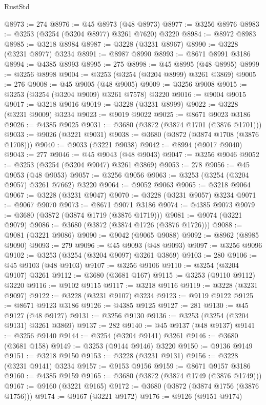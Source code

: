 \begin{lexlean}{RustStd}
\begin{coremodule}
@8973 := 274
@8976 := @45 @8973 (@48 @8973)
@8977 := @3256 @8976
@8983 := @3253 (@3254 (@3204 @8977) @3261 @7620) @3220
@8984 := @8972 @8983
@8985 := @3218 @8984
@8987 := @3228 (@3231 @8967)
@8990 := @3228 (@3231 @8977) @3234
@8991 := @8987 @8990
@8993 := @8671 @8991 @3186
@8994 := @4385 @8993
@8995 := 275
@8998 := @45 @8995 (@48 @8995)
@8999 := @3256 @8998
@9004 := @3253 (@3254 (@3204 @8999) @3261 @3869)
@9005 := 276
@9008 := @45 @9005 (@48 @9005)
@9009 := @3256 @9008
@9015 := @3253 (@3254 (@3204 @9009) @3261 @7578) @3220
@9016 := @9004 @9015
@9017 := @3218 @9016
@9019 := @3228 (@3231 @8999)
@9022 := @3228 (@3231 @9009) @3234
@9023 := @9019 @9022
@9025 := @8671 @9023 @3186
@9026 := @4385 @9025
@9031 := @3680 (@3872 (@3874 @1701 (@3876 @1701)))
@9033 := @9026 (@3221 @9031)
@9038 := @3680 (@3872 (@3874 @1708 (@3876 @1708)))
@9040 := @9033 (@3221 @9038)
@9042 := @8994 (@9017 @9040)
@9043 := 277
@9046 := @45 @9043 (@48 @9043)
@9047 := @3256 @9046
@9052 := @3253 (@3254 (@3204 @9047) @3261 @3869)
@9053 := 278
@9056 := @45 @9053 (@48 @9053)
@9057 := @3256 @9056
@9063 := @3253 (@3254 (@3204 @9057) @3261 @7662) @3220
@9064 := @9052 @9063
@9065 := @3218 @9064
@9067 := @3228 (@3231 @9047)
@9070 := @3228 (@3231 @9057) @3234
@9071 := @9067 @9070
@9073 := @8671 @9071 @3186
@9074 := @4385 @9073
@9079 := @3680 (@3872 (@3874 @1719 (@3876 @1719)))
@9081 := @9074 (@3221 @9079)
@9086 := @3680 (@3872 (@3874 @1726 (@3876 @1726)))
@9088 := @9081 (@3221 @9086)
@9090 := @9042 (@9065 @9088)
@9092 := @8962 (@8985 @9090)
@9093 := 279
@9096 := @45 @9093 (@48 @9093)
@9097 := @3256 @9096
@9102 := @3253 (@3254 (@3204 @9097) @3261 @3869)
@9103 := 280
@9106 := @45 @9103 (@48 @9103)
@9107 := @3256 @9106
@9110 := @3254 (@3204 @9107) @3261
@9112 := @3680 (@3681 @167)
@9115 := @3253 (@9110 @9112) @3220
@9116 := @9102 @9115
@9117 := @3218 @9116
@9119 := @3228 (@3231 @9097)
@9122 := @3228 (@3231 @9107) @3234
@9123 := @9119 @9122
@9125 := @8671 @9123 @3186
@9126 := @4385 @9125
@9127 := 281
@9130 := @45 @9127 (@48 @9127)
@9131 := @3256 @9130
@9136 := @3253 (@3254 (@3204 @9131) @3261 @3869)
@9137 := 282
@9140 := @45 @9137 (@48 @9137)
@9141 := @3256 @9140
@9144 := @3254 (@3204 @9141) @3261
@9146 := @3680 (@3681 @158)
@9149 := @3253 (@9144 @9146) @3220
@9150 := @9136 @9149
@9151 := @3218 @9150
@9153 := @3228 (@3231 @9131)
@9156 := @3228 (@3231 @9141) @3234
@9157 := @9153 @9156
@9159 := @8671 @9157 @3186
@9160 := @4385 @9159
@9165 := @3680 (@3872 (@3874 @1749 (@3876 @1749)))
@9167 := @9160 (@3221 @9165)
@9172 := @3680 (@3872 (@3874 @1756 (@3876 @1756)))
@9174 := @9167 (@3221 @9172)
@9176 := @9126 (@9151 @9174)

\end{coremodule}
\end{lexlean}
